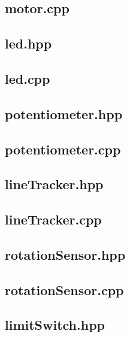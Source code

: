 \subsection{motor.cpp}

\subsection{led.hpp}

\subsection{led.cpp}

\subsection{potentiometer.hpp}

\subsection{potentiometer.cpp}

\subsection{lineTracker.hpp}

\subsection{lineTracker.cpp}

\subsection{rotationSensor.hpp}

\subsection{rotationSensor.cpp}

\subsection{limitSwitch.hpp}

